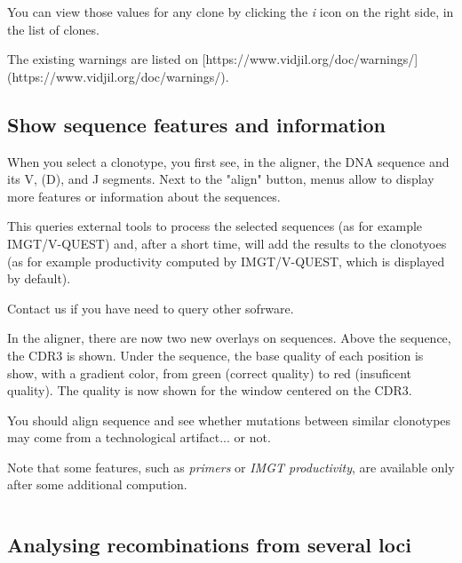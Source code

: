 You can view those values for any clone by clicking the \textit{i} icon on the
right side, in the list of clones.

The existing warnings are listed on [https://www.vidjil.org/doc/warnings/](https://www.vidjil.org/doc/warnings/).

\subsection{Show sequence features and information}

When you select a clonotype, you first see, in the aligner, the DNA sequence and its V, (D), and J segments.
Next to the "align" button, menus allow to display more features or information about the sequences.
 


This queries external tools to process the selected sequences (as for example IMGT/V-QUEST)
and, after a short time, will add the results to the clonotyoes (as for example productivity computed by IMGT/V-QUEST, which is displayed by default).

Contact us if you have need to query other sofrware.



In the aligner, there are now two new overlays on sequences. 
Above the sequence, the CDR3 is shown.
Under the sequence, the base quality of each position is show, with a gradient color, from green (correct quality) to red (insuficent quality). The quality is now shown for the window centered on the CDR3.

You should align sequence and see whether mutations between similar clonotypes may come from a technological artifact... or not.


Note that some features, such as \textit{primers} or \textit{IMGT productivity}, are available only after some additional compution.



\begin{verbatim}
\end{verbatim}

\subsection{Analysing recombinations from several loci}

